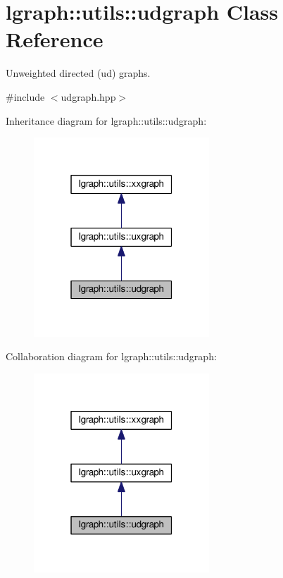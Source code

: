\hypertarget{classlgraph_1_1utils_1_1udgraph}{}\section{lgraph\+:\+:utils\+:\+:udgraph Class Reference}
\label{classlgraph_1_1utils_1_1udgraph}


Unweighted directed (ud) graphs.  




{\ttfamily \#include $<$udgraph.\+hpp$>$}



Inheritance diagram for lgraph\+:\+:utils\+:\+:udgraph\+:\nopagebreak
\begin{figure}[H]
\begin{center}
\leavevmode
\includegraphics[width=187pt]{classlgraph_1_1utils_1_1udgraph__inherit__graph}
\end{center}
\end{figure}


Collaboration diagram for lgraph\+:\+:utils\+:\+:udgraph\+:\nopagebreak
\begin{figure}[H]
\begin{center}
\leavevmode
\includegraphics[width=187pt]{classlgraph_1_1utils_1_1udgraph__coll__graph}
\end{center}
\end{figure}
